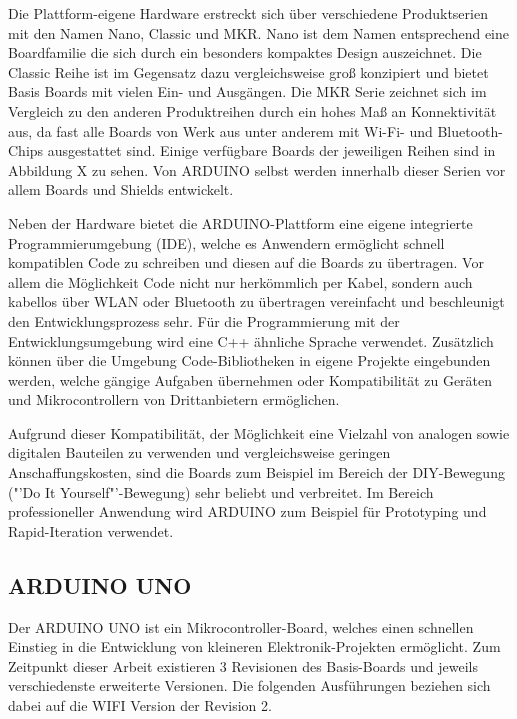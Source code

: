\documentclass[
    load-dhbw-templates,
    load-preamble = true,
    auto-intro-pages = all,
    add-tocs-to-toc,
    debug = true,
    language = english,
    mainlanguage = ngerman,
    add-bibliography,
    bib-file = dhbw-source.bib,
    biblatex/style = alphabetic, 
]{iodhbwm}
\begin{document}
        Die Plattform-eigene Hardware erstreckt sich über verschiedene Produktserien mit den Namen Nano, Classic und MKR. Nano ist dem Namen entsprechend eine Boardfamilie die sich durch ein besonders kompaktes Design auszeichnet. Die Classic Reihe ist im Gegensatz dazu vergleichsweise groß konzipiert und bietet Basis Boards mit vielen Ein- und Ausgängen. Die MKR Serie zeichnet sich im Vergleich zu den anderen Produktreihen durch ein hohes Maß an Konnektivität aus, da fast alle Boards von Werk aus unter anderem mit Wi-Fi- und Bluetooth-Chips ausgestattet sind. Einige verfügbare Boards der jeweiligen Reihen sind in Abbildung X zu sehen. %
        Von ARDUINO selbst werden innerhalb dieser Serien vor allem Boards und Shields entwickelt.%

        Neben der Hardware bietet die ARDUINO-Plattform eine eigene integrierte Programmierumgebung (IDE), welche es Anwendern ermöglicht schnell kompatiblen Code zu schreiben und diesen auf die Boards zu übertragen. Vor allem die Möglichkeit Code nicht nur herkömmlich per Kabel, sondern auch kabellos über WLAN oder Bluetooth zu übertragen vereinfacht und beschleunigt den Entwicklungsprozess sehr. Für die Programmierung mit der Entwicklungsumgebung wird eine C++ ähnliche Sprache verwendet. Zusätzlich können über die Umgebung Code-Bibliotheken in eigene Projekte eingebunden werden, welche gängige Aufgaben übernehmen oder Kompatibilität zu Geräten und Mikrocontrollern von Drittanbietern ermöglichen.%
        
        Aufgrund dieser Kompatibilität, der Möglichkeit eine Vielzahl von analogen sowie digitalen Bauteilen zu verwenden und vergleichsweise geringen Anschaffungskosten, sind die Boards zum Beispiel im Bereich der DIY-Bewegung ("'Do It Yourself"'-Bewegung) sehr beliebt und verbreitet.
        Im Bereich professioneller Anwendung wird ARDUINO zum Beispiel für Prototyping und Rapid-Iteration verwendet.

        \subsection{ARDUINO UNO}


        Der ARDUINO UNO ist ein Mikrocontroller-Board, welches einen schnellen Einstieg in die Entwicklung von kleineren Elektronik-Projekten ermöglicht. Zum Zeitpunkt dieser Arbeit existieren 3 Revisionen des Basis-Boards und jeweils verschiedenste erweiterte Versionen. Die folgenden Ausführungen beziehen sich dabei auf die WIFI Version der Revision 2.
\end{document}
